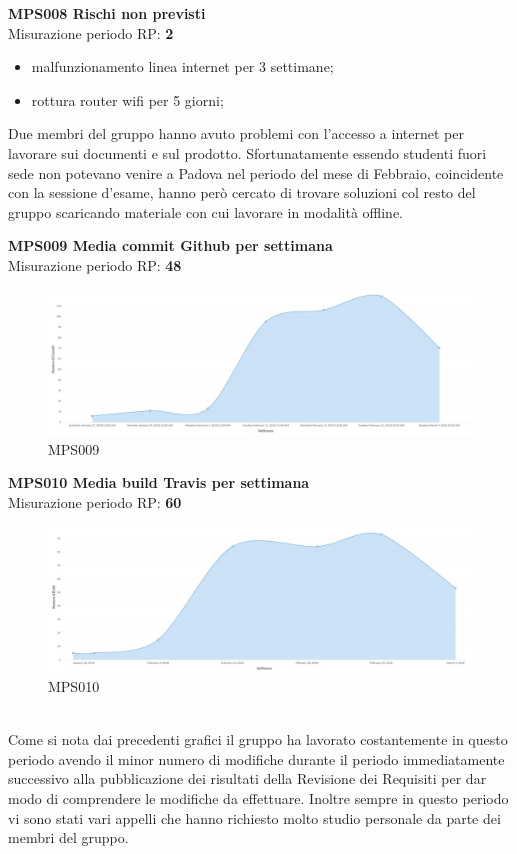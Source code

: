 \documentclass[PianoDiQualifica.tex]{subfiles}
\begin{document}
\textbf{MPS008 Rischi non previsti}\\
Misurazione periodo RP: \textbf{2}
\begin{itemize}
	\item malfunzionamento linea internet \Davide per 3 settimane;
	\item rottura router wifi \Elena per 5 giorni;
\end{itemize}
Due membri del gruppo hanno avuto problemi con l'accesso a internet per lavorare sui documenti e sul prodotto. Sfortunatamente essendo studenti fuori sede non potevano venire a Padova nel periodo del mese di Febbraio, coincidente con la sessione d'esame, hanno però cercato di trovare soluzioni col resto del gruppo scaricando materiale con cui lavorare in modalità offline.

\newpage

\textbf{MPS009 Media commit Github per settimana}\\
Misurazione periodo RP: \textbf{48}
\begin{figure}[htb]
	\centering
	\includegraphics[width=1\linewidth]{RP/MPS009}
	\caption{MPS009}
	\label{fig:processi}
\end{figure}

\textbf{MPS010 Media build Travis per settimana}\\
Misurazione periodo RP: \textbf{60}
\begin{figure}[htb]
	\centering
	\includegraphics[width=1\linewidth]{RP/MPS010}
	\caption{MPS010}
	\label{fig:processi}
\end{figure}
\\
Come si nota dai precedenti grafici il gruppo ha lavorato costantemente in questo periodo avendo il minor numero di modifiche durante il periodo immediatamente successivo alla pubblicazione dei risultati della Revisione dei Requisiti per dar modo di comprendere le modifiche da effettuare.
Inoltre sempre in questo periodo vi sono stati vari appelli che hanno richiesto molto studio personale da parte dei membri del gruppo.
\end{document}
